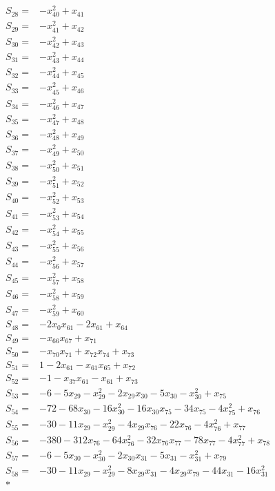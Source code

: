 \begin{align*}
S_{28}={}&-x_{40}^{2}+x_{41}\\[3pt]
S_{29}={}&-x_{41}^{2}+x_{42}\\[3pt]
S_{30}={}&-x_{42}^{2}+x_{43}\\[3pt]
S_{31}={}&-x_{43}^{2}+x_{44}\\[3pt]
S_{32}={}&-x_{44}^{2}+x_{45}\\[3pt]
S_{33}={}&-x_{45}^{2}+x_{46}\\[3pt]
S_{34}={}&-x_{46}^{2}+x_{47}\\[3pt]
S_{35}={}&-x_{47}^{2}+x_{48}\\[3pt]
S_{36}={}&-x_{48}^{2}+x_{49}\\[3pt]
S_{37}={}&-x_{49}^{2}+x_{50}\\[3pt]
S_{38}={}&-x_{50}^{2}+x_{51}\\[3pt]
S_{39}={}&-x_{51}^{2}+x_{52}\\[3pt]
S_{40}={}&-x_{52}^{2}+x_{53}\\[3pt]
S_{41}={}&-x_{53}^{2}+x_{54}\\[3pt]
S_{42}={}&-x_{54}^{2}+x_{55}\\[3pt]
S_{43}={}&-x_{55}^{2}+x_{56}\\[3pt]
S_{44}={}&-x_{56}^{2}+x_{57}\\[3pt]
S_{45}={}&-x_{57}^{2}+x_{58}\\[3pt]
S_{46}={}&-x_{58}^{2}+x_{59}\\[3pt]
S_{47}={}&-x_{59}^{2}+x_{60}\\[3pt]
S_{48}={}&-2x_{0}x_{61}-2x_{61}+x_{64}\\[3pt]
S_{49}={}&-x_{66}x_{67}+x_{71}\\[3pt]
S_{50}={}&-x_{70}x_{71}+x_{72}x_{74}+x_{73}\\[3pt]
S_{51}={}&1-2x_{61}-x_{61}x_{65}+x_{72}\\[3pt]
S_{52}={}&-1-x_{37}x_{61}-x_{61}+x_{73}\\[3pt]
S_{53}={}&-6-5x_{29}-x_{29}^{2}-2x_{29}x_{30}-5x_{30}-x_{30}^{2}+x_{75}\\[3pt]
S_{54}={}&-72-68x_{30}-16x_{30}^{2}-16x_{30}x_{75}-34x_{75}-4x_{75}^{2}+x_{76}\\[3pt]
S_{55}={}&-30-11x_{29}-x_{29}^{2}-4x_{29}x_{76}-22x_{76}-4x_{76}^{2}+x_{77}\\[3pt]
S_{56}={}&-380-312x_{76}-64x_{76}^{2}-32x_{76}x_{77}-78x_{77}-4x_{77}^{2}+x_{78}\\[3pt]
S_{57}={}&-6-5x_{30}-x_{30}^{2}-2x_{30}x_{31}-5x_{31}-x_{31}^{2}+x_{79}\\[3pt]
S_{58}={}&-30-11x_{29}-x_{29}^{2}-8x_{29}x_{31}-4x_{29}x_{79}-44x_{31}-16x_{31}^{2}\\*

\end{align*}
